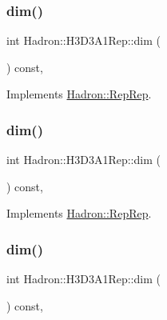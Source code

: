 \subsubsection{\texorpdfstring{dim()}{dim()}\hspace{0.1cm}{\footnotesize\ttfamily [3/5]}}
{\footnotesize\ttfamily int Hadron\+::\+H3\+D3\+A1\+Rep\+::dim (\begin{DoxyParamCaption}{ }\end{DoxyParamCaption}) const\hspace{0.3cm}{\ttfamily [inline]}, {\ttfamily [virtual]}}



Implements \mbox{\hyperlink{structHadron_1_1RepRep_a92c8802e5ed7afd7da43ccfd5b7cd92b}{Hadron\+::\+Rep\+Rep}}.

\mbox{\label{structHadron_1_1H3D3A1Rep_ac7d5289dfab1007d156e2eef2b159026}} 
\subsubsection{\texorpdfstring{dim()}{dim()}\hspace{0.1cm}{\footnotesize\ttfamily [4/5]}}
{\footnotesize\ttfamily int Hadron\+::\+H3\+D3\+A1\+Rep\+::dim (\begin{DoxyParamCaption}{ }\end{DoxyParamCaption}) const\hspace{0.3cm}{\ttfamily [inline]}, {\ttfamily [virtual]}}



Implements \mbox{\hyperlink{structHadron_1_1RepRep_a92c8802e5ed7afd7da43ccfd5b7cd92b}{Hadron\+::\+Rep\+Rep}}.

\mbox{\label{structHadron_1_1H3D3A1Rep_ac7d5289dfab1007d156e2eef2b159026}} 
\subsubsection{\texorpdfstring{dim()}{dim()}\hspace{0.1cm}{\footnotesize\ttfamily [5/5]}}
{\footnotesize\ttfamily int Hadron\+::\+H3\+D3\+A1\+Rep\+::dim (\begin{DoxyParamCaption}{ }\end{DoxyParamCaption}) const\hspace{0.3cm}{\ttfamily [inline]}, {\ttfamily [virtual]}}



